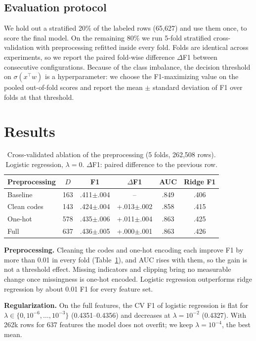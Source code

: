 \documentclass[10pt,conference,compsocconf]{IEEEtran}
\begin{document}
\subsection{Evaluation protocol}
We hold out a stratified 20\% of the labeled rows (65,627) and use them once,
to score the final model. On the remaining 80\% we run 5-fold stratified
cross-validation with preprocessing refitted inside every fold. Folds are
identical across experiments, so we report the paired fold-wise difference
$\Delta$F1 between consecutive configurations. Because of the class imbalance,
the decision threshold on $\sigma(x^\top w)$ is a hyperparameter: we choose the
F1-maximizing value on the pooled out-of-fold scores and report the mean $\pm$
standard deviation of F1 over folds at that threshold.

\section{Results}

\begin{table}[tbp]
  \centering
  \caption{Cross-validated ablation of the preprocessing (5 folds, 262,508
  rows). Logistic regression, $\lambda=0$. $\Delta$F1: paired difference to
  the previous row.}
  \label{tab:ablation}
  \begin{tabular}{@{}lccccc@{}}
    \toprule
    Preprocessing & $D$ & F1 & $\Delta$F1 & AUC & Ridge F1 \\
    \midrule
    Baseline     & 163 & .411$\pm$.004 & --            & .849 & .406 \\
    Clean codes  & 143 & .424$\pm$.004 & +.013$\pm$.002 & .858 & .415 \\
    One-hot      & 578 & .435$\pm$.006 & +.011$\pm$.004 & .863 & .425 \\
    Full         & 637 & .436$\pm$.005 & +.000$\pm$.001 & .863 & .426 \\
    \bottomrule
  \end{tabular}
\end{table}

\textbf{Preprocessing.} Cleaning the codes and one-hot encoding each improve F1
by more than 0.01 in every fold (Table~\ref{tab:ablation}), and AUC rises with
them, so the gain is not a threshold effect. Missing indicators and clipping
bring no measurable change once missingness is one-hot encoded. Logistic
regression outperforms ridge regression by about 0.01 F1 for every feature set.

\textbf{Regularization.} On the full features, the CV F1 of logistic regression
is flat for $\lambda \in \{0, 10^{-6}, \dots, 10^{-3}\}$ (0.4351--0.4356) and
decreases at $\lambda=10^{-2}$ (0.4327). With 262k rows for 637 features the
model does not overfit; we keep $\lambda=10^{-4}$, the best mean.
\end{document}
